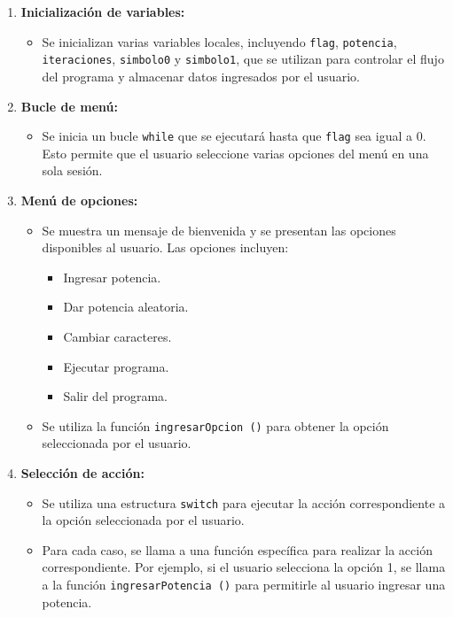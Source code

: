 \documentclass{article}
\begin{document}
                \begin{enumerate}
                    \item \textbf{Inicialización de variables:}
                    \begin{itemize}
                        \item Se inicializan varias variables locales, incluyendo \texttt{flag}, \texttt{potencia}, \texttt{iteraciones}, \texttt{simbolo0} y \texttt{simbolo1}, que se utilizan para controlar el flujo del programa y almacenar datos ingresados por el usuario.
                    \end{itemize}

                    \item \textbf{Bucle de menú:}
                    \begin{itemize}
                        \item Se inicia un bucle \texttt{while} que se ejecutará hasta que \texttt{flag} sea igual a 0. Esto permite que el usuario seleccione varias opciones del menú en una sola sesión.
                    \end{itemize}

                    \item \textbf{Menú de opciones:}
                    \begin{itemize}
                        \item Se muestra un mensaje de bienvenida y se presentan las opciones disponibles al usuario. Las opciones incluyen:
                        \begin{itemize}
                            \item Ingresar potencia.
                            \item Dar potencia aleatoria.
                            \item Cambiar caracteres.
                            \item Ejecutar programa.
                            \item Salir del programa.
                        \end{itemize}
                        \item Se utiliza la función \texttt{ingresarOpcion ()} para obtener la opción seleccionada por el usuario.
                    \end{itemize}

                    \item \textbf{Selección de acción:}
                    \begin{itemize}
                        \item Se utiliza una estructura \texttt{switch} para ejecutar la acción correspondiente a la opción seleccionada por el usuario.
                        \item Para cada caso, se llama a una función específica para realizar la acción correspondiente. Por ejemplo,
                        si el usuario selecciona la opción 1, se llama a la función \texttt{ingresarPotencia ()} para permitirle al
                        usuario ingresar una potencia.
                    \end{itemize}


\end{enumerate}
\end{document}
